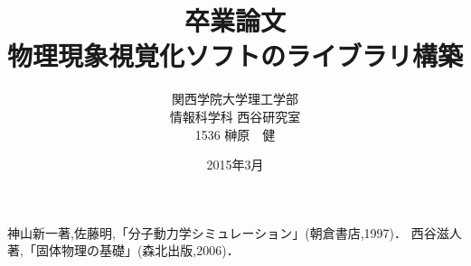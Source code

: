 \documentclass[12pt,a4]{jreport}%
\title{卒業論文\\物理現象視覚化ソフトのライブラリ構築}
\author{関西学院大学理工学部\\情報科学科 西谷研究室\\1536 榊原　健}
\date{2015年3月}
\begin{document}
\maketitle
\newpage



\tableofcontents



\begin{thebibliography}{9}
神山新一著,佐藤明,「分子動力学シミュレーション」(朝倉書店,1997)．
西谷滋人著,「固体物理の基礎」(森北出版,2006)．
\end{thebibliography}
\end{document}
